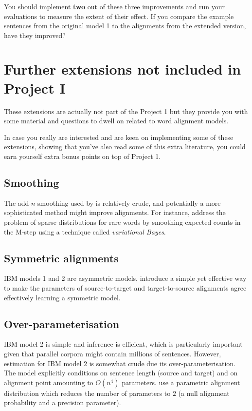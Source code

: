 You should implement {\bf two} out of these three improvements and run your evaluations
to measure the extent of their effect.
If you compare the example sentences from the original model 1 to the
alignments from the extended version, have they improved?
%
%
\section{Further extensions not included in Project I}
These extensions are actually not part of the Project 1 but they provide you with
some material and questions to dwell on related to word alignment models.

In case you really are interested and are keen on implementing some of these
extensions, showing that you've also read some of this extra literature, 
you could earn yourself extra bonus points on top of Project 1.
%
%
\subsection*{Smoothing}

The add-$n$ smoothing used by \cite{Moore:2004:IBM1} is relatively
crude, and potentially a more sophisticated method might improve
alignments.  For instance, \citet{Riley+2012:VBWA} address the problem
of sparse distributions for rare words by smoothing expected counts in
the M-step using a technique called \emph{variational Bayes}.


\subsection*{Symmetric alignments}

IBM models 1 and 2 are asymmetric models, \citep{Liang+2006:ABA} introduce a simple yet effective way to make the parameters of source-to-target and target-to-source alignments agree effectively learning a symmetric model.

\subsection*{Over-parameterisation}
IBM model 2 is simple and inference is efficient, which is particularly important given that parallel corpora might contain millions of sentences. 
However, estimation for IBM model 2 is somewhat crude due its over-parameterisation. 
The model explicitly conditions on sentence length (source and target) and on alignment point amounting to $O(n^4)$ parameters.
\cite{Dyer+2013:IBM2} use a parametric alignment distribution which reduces the number of parameters to $2$ (a null alignment probability and a precision parameter).

